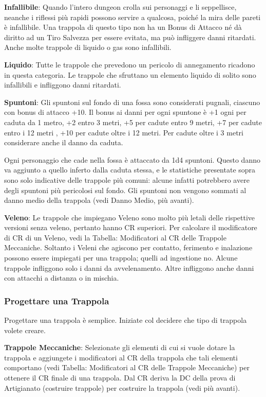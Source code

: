 \documentclass[a4paper,11pt,twoside,openany]{book}
\begin{document}
\textbf{Infallibile}: Quando l'intero dungeon crolla sui personaggi e li seppellisce, neanche i riflessi più rapidi possono servire a qualcosa, poiché la mira delle pareti è infallibile. Una trappola di questo tipo non ha un Bonus di Attacco né dà diritto ad un Tiro Salvezza per essere evitata, ma può infliggere danni ritardati. Anche molte trappole di liquido o gas sono infallibili.

\textbf{Liquido}: Tutte le trappole che prevedono un pericolo di annegamento ricadono in questa categoria. Le trappole che sfruttano un elemento liquido di solito sono infallibili e infliggono danni ritardati.

\textbf{Spuntoni}: Gli spuntoni sul fondo di una fossa sono considerati pugnali, ciascuno con bonus di attacco +10. Il bonus ai danni per ogni spuntone è +1 ogni per caduta da 1 metro, +2 entro 3 metri, +5 per cadute entro 9 metri, +7 per cadute entro i 12 metri , +10 per cadute oltre i 12 metri. Per cadute oltre i 3 metri considerare anche il danno da caduta.

Ogni personaggio che cade nella fossa è attaccato da 1d4 spuntoni. Questo danno va aggiunto a quello inferto dalla caduta stessa, e le statistiche presentate sopra sono solo indicative delle trappole più comuni: alcune infatti potrebbero avere degli spuntoni più pericolosi sul fondo. Gli spuntoni non vengono sommati al danno medio della trappola (vedi Danno Medio, più avanti).

\textbf{Veleno}: Le trappole che impiegano Veleno sono molto più letali delle rispettive versioni senza veleno, pertanto hanno CR superiori. Per calcolare il modificatore di CR di un Veleno, vedi la Tabella: Modificatori al CR delle Trappole Meccaniche. Soltanto i Veleni che agiscono per contatto, ferimento e inalazione possono essere impiegati per una trappola; quelli ad ingestione no. Alcune trappole infliggono solo i danni da avvelenamento. Altre infliggono anche danni con attacchi a distanza o in mischia.

\subsubsection{Progettare una Trappola}

Progettare una trappola è semplice. Iniziate col decidere che tipo di trappola volete creare.

\textbf{Trappole Meccaniche}: Selezionate gli elementi di cui si vuole dotare la trappola e aggiungete i modificatori al CR della trappola che tali elementi comportano (vedi Tabella: Modificatori al CR delle Trappole Meccaniche) per ottenere il CR finale di una trappola. Dal CR deriva la DC della prova di Artigianato (costruire trappole) per costruire la trappola (vedi più avanti).
\end{document}
